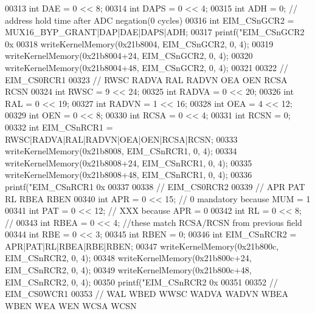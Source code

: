 \begin{DoxyCode}
{{{{{00313     \textcolor{keywordtype}{int} DAE = 0 << 8;
00314     \textcolor{keywordtype}{int} DAPS = 0 << 4;
00315     \textcolor{keywordtype}{int} ADH = 0; \textcolor{comment}{// address hold time after ADC negation(0 cycles)}
00316     \textcolor{keywordtype}{int} EIM\_CSnGCR2 = MUX16\_BYP\_GRANT|DAP|DAE|DAPS|ADH;
00317     printf(\textcolor{stringliteral}{"EIM\_CSnGCR2 0x%
00318     writeKernelMemory(0x21b8004, EIM\_CSnGCR2, 0, 4);
00319     writeKernelMemory(0x21b8004+24, EIM\_CSnGCR2, 0, 4);
00320     writeKernelMemory(0x21b8004+48, EIM\_CSnGCR2, 0, 4);
00321 
00322     \textcolor{comment}{// EIM\_CS0RCR1}
00323     \textcolor{comment}{// RWSC RADVA RAL RADVN OEA OEN RCSA RCSN}
00324     \textcolor{keywordtype}{int} RWSC = 9 << 24;
00325     \textcolor{keywordtype}{int} RADVA = 0 << 20;
00326     \textcolor{keywordtype}{int} RAL = 0 << 19;
00327     \textcolor{keywordtype}{int} RADVN = 1 << 16;
00328     \textcolor{keywordtype}{int} OEA = 4 << 12;
00329     \textcolor{keywordtype}{int} OEN = 0 << 8;
00330     \textcolor{keywordtype}{int} RCSA = 0 << 4;
00331     \textcolor{keywordtype}{int} RCSN = 0;
00332     \textcolor{keywordtype}{int} EIM\_CSnRCR1 = RWSC|RADVA|RAL|RADVN|OEA|OEN|RCSA|RCSN;
00333     writeKernelMemory(0x21b8008, EIM\_CSnRCR1, 0, 4);
00334     writeKernelMemory(0x21b8008+24, EIM\_CSnRCR1, 0, 4);
00335     writeKernelMemory(0x21b8008+48, EIM\_CSnRCR1, 0, 4);
00336     printf(\textcolor{stringliteral}{"EIM\_CSnRCR1 0x%
00337 
00338     \textcolor{comment}{// EIM\_CS0RCR2}
00339     \textcolor{comment}{// APR PAT RL RBEA RBEN}
00340     \textcolor{keywordtype}{int} APR = 0 << 15; \textcolor{comment}{// 0 mandatory because MUM = 1}
00341     \textcolor{keywordtype}{int} PAT = 0 << 12; \textcolor{comment}{// XXX because APR = 0}
00342     \textcolor{keywordtype}{int} RL = 0 << 8; \textcolor{comment}{//}
00343     \textcolor{keywordtype}{int} RBEA = 0 << 4; \textcolor{comment}{//these match RCSA/RCSN from previous field}
00344     \textcolor{keywordtype}{int} RBE = 0 << 3;
00345     \textcolor{keywordtype}{int} RBEN = 0;
00346     \textcolor{keywordtype}{int} EIM\_CSnRCR2 = APR|PAT|RL|RBEA|RBE|RBEN;
00347     writeKernelMemory(0x21b800c, EIM\_CSnRCR2, 0, 4);
00348     writeKernelMemory(0x21b800c+24, EIM\_CSnRCR2, 0, 4);
00349     writeKernelMemory(0x21b800c+48, EIM\_CSnRCR2, 0, 4);
00350     printf(\textcolor{stringliteral}{"EIM\_CSnRCR2 0x%
00351 
00352     \textcolor{comment}{// EIM\_CS0WCR1}
00353     \textcolor{comment}{// WAL WBED WWSC WADVA WADVN WBEA WBEN WEA WEN WCSA WCSN}
}}}}}}}}
\end{DoxyCode}
